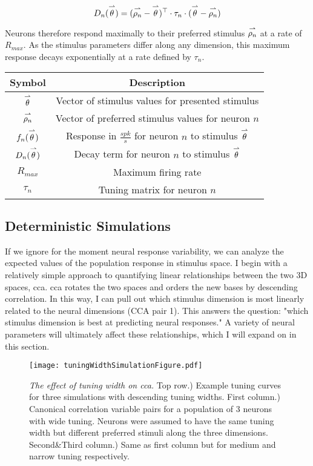 \begin{equation}
	\label{eq:decay}
	D_n(\overset{\rightharpoonup}\theta) = (\overset{\rightharpoonup}{\rho_n} -\overset{\rightharpoonup}\theta)^\top \cdot \tau_n \cdot (\overset{\rightharpoonup}\theta-\overset{\rightharpoonup}{\rho_n})
\end{equation}

Neurons therefore respond maximally to their preferred stimulus $\overset{\rightharpoonup}{\rho_n}$ at a rate of $R_{max}$. As the stimulus parameters differ along any dimension, this maximum response decays exponentially at a rate defined by $\tau_n$.

\begin{table}
	\centering
	\begin{tabular}{|c|c|}
		\hline
		\textbf{Symbol}       & \textbf{Description} \\
		\hline
		$\overset{\rightharpoonup}\theta$      & Vector of stimulus values for presented stimulus \\
		$\overset{\rightharpoonup}{\rho_n}$    & Vector of preferred stimulus values for neuron $n$ \\
		$f_n(\overset{\rightharpoonup}\theta)$ & Response in $\frac{spk}{s}$ for neuron $n$ to stimulus $\overset{\rightharpoonup}\theta$ \\
		$D_n(\overset{\rightharpoonup}\theta)$ & Decay term for neuron $n$ to stimulus $\overset{\rightharpoonup}\theta$ \\
		$R_{max}$             & Maximum firing rate \\
		$\tau_n$              & Tuning matrix for neuron $n$ \\
		\hline
	\end{tabular}
	\label{tbl:symbols}
\end{table}


\subsection{Deterministic Simulations}
If we ignore for the moment neural response variability, we can analyze the expected values of the population response in stimulus space. I begin with a relatively simple approach to quantifying linear relationships between the two 3D spaces, \gls{cca}. \gls{cca} rotates the two spaces and orders the new bases by descending correlation. In this way, I can pull out which stimulus dimension is most linearly related to the neural dimensions (CCA pair 1). This answers the question: "which stimulus dimension is best at predicting neural responses." A variety of neural parameters will ultimately affect these relationships, which I will expand on in this section. 

	\begin{figure}
		\centering
		\texttt{[image: tuningWidthSimulationFigure.pdf]}
		{\caption{{\it The effect of tuning width on \gls{cca}.} Top row.) Example tuning curves for three simulations with descending tuning widths. First column.) Canonical correlation variable pairs for a population of 3 neurons with wide tuning. Neurons were assumed to have the same tuning width but different preferred stimuli along the three dimensions. Second\&Third column.) Same as first column but for medium and narrow tuning respectively.}
		\label{fig:ccaTuning}}
	\end{figure}

